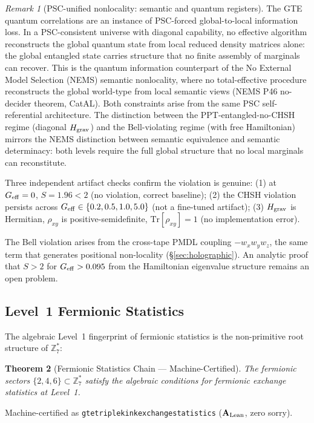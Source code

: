 \documentclass[11pt]{article}
\newtheorem{theorem}{Theorem}[section]
\theoremstyle{remark}
\newtheorem{remark}[theorem]{Remark}
\newcommand{\ZS}{\mathbb{Z}_7}
\newcommand{\lean}[1]{%
  \penalty-100
  \begingroup\def\_{\textunderscore\allowbreak}\texttt{#1}\endgroup}
\newcommand{\CatAL}{\ensuremath{\textbf{A}_{\rm Lean}}}
\begin{document}
\begin{remark}[PSC-unified nonlocality: semantic and quantum registers]
\label{rem:psc_unified_nonlocality_cmca}
The GTE quantum correlations are an instance of PSC-forced global-to-local information loss.
In a PSC-consistent universe with diagonal capability, no effective algorithm reconstructs
the global quantum state from local reduced density matrices alone: the global entangled state
carries structure that no finite assembly of marginals can recover. This is the quantum
information counterpart of the No External Model Selection (NEMS) semantic nonlocality, where no total-effective procedure
reconstructs the global world-type from local semantic views (NEMS P46 no-decider theorem,
CatAL). Both constraints arise from the same PSC self-referential architecture. The
distinction between the PPT-entangled-no-CHSH regime (diagonal $H_{\rm grav}$) and the
Bell-violating regime (with free Hamiltonian) mirrors the NEMS distinction between semantic
equivalence and semantic determinacy: both levels require the full global structure that
no local marginals can reconstitute.
\end{remark}

Three independent artifact checks confirm the violation is genuine:
(1) at $G_{\rm eff} = 0$, $S = 1.96 < 2$ (no violation, correct baseline);
(2) the CHSH violation persists across $G_{\rm eff} \in \{0.2, 0.5, 1.0, 5.0\}$
(not a fine-tuned artifact);
(3) $H_{\rm grav}$ is Hermitian, $\rho_{xy}$ is positive-semidefinite, $\mathrm{Tr}[\rho_{xy}]=1$
(no implementation error).

The Bell violation arises from the cross-tape PMDL coupling $-w_xw_yw_z$,
the same term that generates positional non-locality (\S\ref{sec:holographic}).
An analytic proof that $S > 2$ for $G_{\rm eff} > 0.095$ from the Hamiltonian
eigenvalue structure remains an open problem.

\subsection{Level~1 Fermionic Statistics}

The algebraic Level~1 fingerprint of fermionic statistics is the
non-primitive root structure of $\ZS^*$:

\begin{theorem}[Fermionic Statistics Chain --- Machine-Certified]
The fermionic sectors $\{2,4,6\} \subset \ZS^*$ satisfy the algebraic
conditions for fermionic exchange statistics at Level~1.
\end{theorem}
Machine-certified as \lean{gte\_triple\_kink\_exchange\_statistics}
($\CatAL$, zero sorry).
\end{document}
